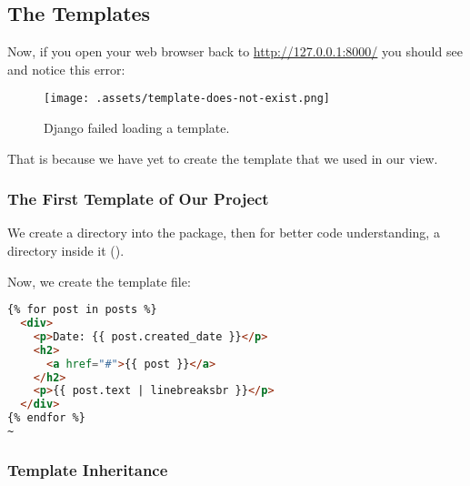 \subsection{The Templates}
    Now, if you open your web browser back to \url{http://127.0.0.1:8000/} you should see and notice this error:
    \begin{figure}[H]
        \centering
        \texttt{[image: .assets/template-does-not-exist.png]}
        \caption{Django failed loading a template.}
    \end{figure}
    
    That is because we have yet to create the  template that we used in our view.
    
    \subsubsection{The First Template of Our Project}
        We create a  directory into the  package, 
        then for better code understanding, a  directory inside it ().
        
        Now, we create the template file:
        
        \begin{lstlisting}[language=html, title=blog/templates/blog/post\textunderscore list.html, escapechar=\~]
{% for post in posts %}
  <div>
    <p>Date: {{ post.created_date }}</p>
    <h2>
      <a href="#">{{ post }}</a>
    </h2>
    <p>{{ post.text | linebreaksbr }}</p>
  </div>
{% endfor %}
~
        \end{lstlisting}
    
    \subsubsection{Template Inheritance}

